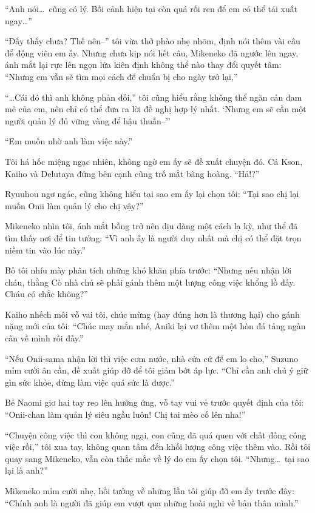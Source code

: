 ﻿\documentclass[../main.tex]{subfiles}
\begin{document}
``Anh nói\dots\ cũng có lý. Bối cảnh hiện tại còn quá rối ren để em có thể tái xuất ngay\dots''

``Đấy thấy chưa? Thế nên--'' tôi vừa thở phào nhẹ nhõm, định nói thêm vài câu để động viên em ấy. Nhưng chưa kịp nói hết câu, Mikeneko đã ngước lên ngay, ánh mắt lại rực lên ngọn lửa kiên định không thể nào thay đổi quyết tâm: ``Nhưng em vẫn sẽ tìm mọi cách để chuẩn bị cho ngày trở lại,''

``\dots Cái đó thì anh không phản đối,'' tôi cũng hiểu rằng không thể ngăn cản đam mê của em, nên chỉ có thể đưa ra lời đề nghị hợp lý nhất. `Nhưng em sẽ cần một người quản lý đủ vững vàng để hậu thuẫn--''

``Em muốn nhờ anh làm việc này.''

Tôi há hốc miệng ngạc nhiên, không ngờ em ấy sẽ đề xuất chuyện đó. Cả Kson, Kaiho và Delutaya đứng bên cạnh cũng trố mắt bàng hoàng. ``Hả!?''

Ryuuhou ngơ ngác, cũng không hiểu tại sao em ấy lại chọn tôi: ``Tại sao chị lại muốn Onii làm quản lý cho chị vậy?''

Mikeneko nhìn tôi, ánh mắt bỗng trở nên dịu dàng một cách lạ kỳ, như thể đã tìm thấy nơi để tin tưởng: ``Vì anh ấy là người duy nhất mà chị có thể đặt trọn niềm tin vào lúc này.''

Bố tôi nhíu mày phân tích những khó khăn phía trước: ``Nhưng nếu nhận lời cháu, thằng Cò nhà chú sẽ phải gánh thêm một lượng công việc khổng lồ đấy. Cháu có chắc không?''

Kaiho nhếch môi vỗ vai tôi, chúc mừng (hay đúng hơn là thương hại) cho gánh nặng mới của tôi: ``Chúc may mắn nhé, Aniki lại vơ thêm một hòn đá tảng ngàn cân về mình rồi đấy.''

``Nếu Onii-sama nhận lời thì việc cơm nước, nhà cửa cứ để em lo cho,'' Suzuno mỉm cười ân cần, đề xuất giúp đỡ để tôi giảm bớt áp lực. ``Chỉ cần anh chú ý giữ gìn sức khỏe, đừng làm việc quá sức là được.''

Bé Naomi giơ hai tay reo lên hưởng ứng, vỗ tay vui vẻ trước quyết định của tôi: ``Onii-chan làm quản lý siêu ngầu luôn! Chị tai mèo cố lên nha!''

``Chuyện công việc thì con không ngại, con cũng đã quá quen với chất đống công việc rồi,'' tôi xua tay, không quan tâm đến khối lượng công việc thêm vào. Rồi tôi quay sang Mikeneko, vẫn còn thắc mắc về lý do em ấy chọn tôi. ``Nhưng\dots\ tại sao lại là anh?''

Mikeneko mỉm cười nhẹ, hồi tưởng về những lần tôi giúp đỡ em ấy trước đây: ``Chính anh là người đã giúp em vượt qua những hoài nghi về bản thân mình.''
\end{document}
